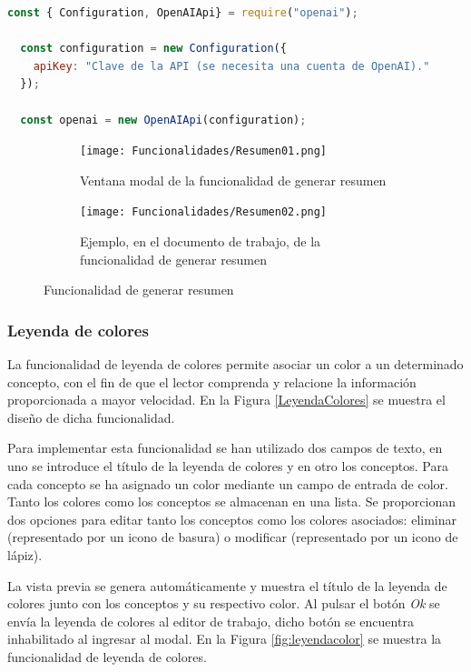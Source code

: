 \begin{lstlisting}[label=fig:impresumenconfiguracion, caption=Configuración de la clase \textit{OpenAIApi}., language=JavaScript, float, floatplacement=H]
  const { Configuration, OpenAIApi} = require("openai");

  const configuration = new Configuration({
    apiKey: "Clave de la API (se necesita una cuenta de OpenAI)."
  });

  const openai = new OpenAIApi(configuration);
\end{lstlisting}

\begin{figure}[ht!]
  \centering
  \begin{subfigure}{\textwidth}
    \centering
    \texttt{[image: Funcionalidades/Resumen01.png]}
    \caption{Ventana modal de la funcionalidad de generar resumen}
    \label{fig:impresumen01}
  \end{subfigure}

  \begin{subfigure}{\textwidth}
    \centering
    \texttt{[image: Funcionalidades/Resumen02.png]}
    \caption{Ejemplo, en el documento de trabajo, de la funcionalidad de generar resumen}
    \label{fig:impresumen02}
  \end{subfigure}

  \caption{Funcionalidad de generar resumen}
  \label{fig:impresumen}
\end{figure}

\subsubsection{Leyenda de colores}
\label{sec:leyendaColores}
La funcionalidad de leyenda de colores permite asociar un color a un determinado concepto, con el fin de que el lector comprenda y relacione la información proporcionada a mayor velocidad. En la Figura \ref{LeyendaColores} se muestra el diseño de dicha funcionalidad.

Para implementar esta funcionalidad se han utilizado dos campos de texto, en uno se introduce el título de la leyenda de colores y en otro los conceptos. Para cada concepto se ha asignado un color mediante un campo de entrada de color. Tanto los colores como los conceptos se almacenan en una lista. Se proporcionan dos opciones para editar tanto los conceptos como los colores asociados: eliminar (representado por un icono de basura) o modificar (representado por un icono de lápiz).

La vista previa se genera automáticamente y muestra el título de la leyenda de colores junto con los conceptos y su respectivo color. Al pulsar el botón \textit{Ok} se envía la leyenda de colores al editor de trabajo, dicho botón se encuentra inhabilitado al ingresar al modal. En la Figura \ref{fig:leyendacolor} se muestra la funcionalidad de leyenda de colores.

